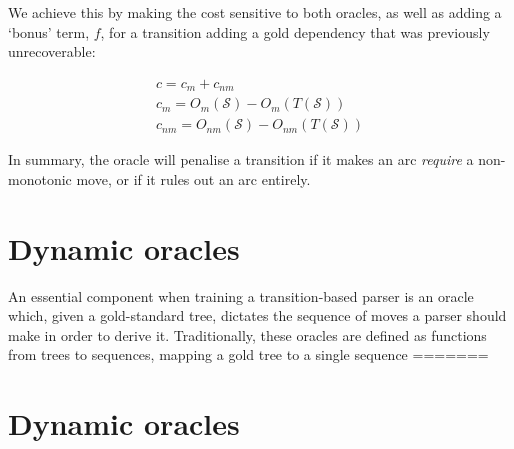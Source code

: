 \documentclass[11pt,letterpaper]{article}
\newcommand{\state}{\mathcal{S}}
\begin{document}
We achieve this by making the cost sensitive to both oracles, as well as adding a
`bonus' term, $f$, for a transition adding a gold dependency that was previously
unrecoverable:

\begin{eqnarray}
c = c_m + c_{nm}\\
c_m = O_m(\state) - O_m(T(\state))\\
c_{nm} = O_{nm}(\state) - O_{nm}(T(\state))
\end{eqnarray}

In summary, the oracle will penalise a transition if it makes an arc \emph{require}
a non-monotonic move, or if it rules out an arc entirely.

\section{Dynamic oracles} 
 
 An essential component when training a transition-based parser is an oracle
 which, given a gold-standard tree, dictates the sequence of moves a parser
 should make in order to derive it.  Traditionally, these oracles are defined
 as functions from trees to sequences, mapping a gold tree to a single sequence
=======
\section{Dynamic oracles}
\end{document}

